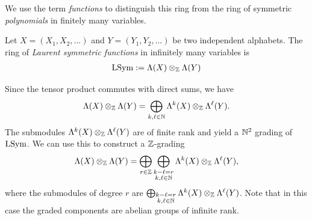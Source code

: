 \documentclass[11pt]{amsart}
\begin{document}
We use the term \textit{functions} to distinguish this ring from the ring of symmetric \textit{polynomials} in finitely many variables. 

\begin{defin}
    Let $X = (X_1, X_2, \dots) $ and $Y=(Y_1 , Y_2, \dots )$ be two independent alphabets. The ring of \emph{Laurent symmetric functions} in infinitely many variables is
    \begin{align}
        \mathrm{LSym} := \Lambda(X) \otimes_{\mathbb{Z}} \Lambda (Y)
    \end{align}
    
\end{defin}

\begin{rem}
    Since the tensor product commutes with direct sums, we have
    \begin{align}
        \Lambda(X) \otimes_{\mathbb{Z}} \Lambda (Y) = \bigoplus_{k,\ell \in \mathbb{N}} \Lambda^k (X) \otimes_{\mathbb{Z}} \Lambda^\ell (Y).
    \end{align}
The submodules \(\Lambda^k (X) \otimes_{\mathbb{Z}} \Lambda^\ell (Y)\) are of finite rank and yield a \(\mathbb{N}^2\) grading of \(\mathrm{LSym}\). We can use this to construct a $\mathbb{Z}$-grading
\[
\Lambda(X) \otimes_{\mathbb{Z}} \Lambda (Y) = \bigoplus_{r \in \mathbb{Z}} \bigoplus_{\substack{k - \ell = r\\ k,\ell \in \mathbb{N}}} \Lambda^k (X) \otimes_{\mathbb{Z}} \Lambda^\ell (Y),
\]
where the submodules of degree $r$ are \(\bigoplus_{\substack{k - \ell = r\\ k,\ell \in \mathbb{N}}} \Lambda^k (X) \otimes_{\mathbb{Z}} \Lambda^\ell (Y)\). Note that in this case the graded components are abelian groups of infinite rank.
\end{rem}
\end{document}

